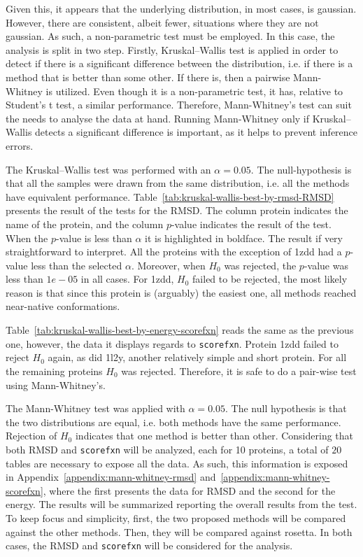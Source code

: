 Given this, it appears that the underlying distribution, in most cases, is
gaussian. However, there are consistent, albeit fewer, situations where they are
not gaussian. As such, a non-parametric test must be employed. In this case, the
analysis is split in two step. Firstly, Kruskal–Wallis test is applied in order
to detect if there is a significant difference between the distribution, i.e.
if there is a method that is better than some other. If there is, then
a pairwise Mann-Whitney is utilized. Even though it is a non-parametric test, it
has, relative to Student's t test, a similar performance. Therefore,
Mann-Whitney's test can suit the needs to analyse the data at hand. Running
Mann-Whitney only if Kruskal–Wallis detects a significant difference is
important, as it helps to prevent inference errors.

The Kruskal–Wallis test was performed with an $\alpha = 0.05$. The null-hypothesis
is that all the samples were drawn from the same distribution, i.e. all the
methods have equivalent performance.
Table~\ref{tab:kruskal-wallis-best-by-rmsd-RMSD} presents the result of the
tests for the RMSD.
The column protein indicates the name of the protein, and the column
$p$-value indicates the result of the test. When the $p$-value is less than
$\alpha$ it is highlighted in boldface. The result if very straightforward to
interpret. All the proteins with the exception of 1zdd had a $p$-value less
than the selected $\alpha$. Moreover, when $H_0$ was rejected, the $p$-value
was less than $1e-05$ in all cases. For 1zdd, $H_0$ failed to be rejected, the
most likely reason is that since this protein is (arguably) the easiest one,
all methods reached near-native conformations.

Table~\ref{tab:kruskal-wallis-best-by-energy-scorefxn} reads the same
as the previous one, however, the data it displays regards to \texttt{scorefxn}.
Protein 1zdd failed to reject $H_0$ again, as did 1l2y, another relatively
simple and short protein. For all the remaining proteins $H_0$ was rejected.
Therefore, it is safe to do a pair-wise test using Mann-Whitney's.



The Mann-Whitney test was applied with $\alpha = 0.05$. The null hypothesis is
that the two distributions are equal, i.e. both methods have the same
performance. Rejection of $H_0$ indicates that one method is better than other.
Considering that both RMSD and \texttt{scorefxn} will be analyzed, each for
10 proteins, a total of $20$ tables are necessary to expose all the data. As
such, this information is exposed in Appendix~\ref{appendix:mann-whitney-rmsd}
and~\ref{appendix:mann-whitney-scorefxn}, where the first presents the data for
RMSD and the second for the energy. The results will be summarized reporting the
overall results from the test. To keep focus and simplicity, first, the two
proposed methods will be compared against the other methods. Then, they will be
compared against rosetta. In both cases, the RMSD and \texttt{scorefxn} will be
considered for the analysis.

